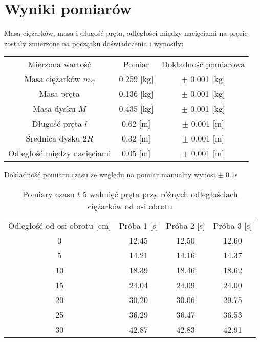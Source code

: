 \documentclass[10pt,a4paper]{article}
\newcommand{\forceindent}{\leavevmode{\parindent=3em\indent}}
\begin{document}
\section{Wyniki pomiarów}
\forceindent Masa ciężarków, masa i długość pręta, odległości między nacięciami na pręcie zostały zmierzone na początku doświadczenia i wynosiły:\\
\begin{center}
\begin{tabular}{|c|c|c|}
\hline
Mierzona wartość & Pomiar & Dokładność pomiarowa\\
\hhline{|=|=|=|}
Masa ciężarków $m_C$ & 0.259 [kg] & $\pm$ 0.001 [kg]\\
Masa pręta & 0.136 [kg] & $\pm$ 0.001 [kg]\\
Masa dysku $M$& 0.435 [kg] & $\pm$ 0.001 [kg]\\
\hline
Długość pręta $l$& 0.62 [m] & $\pm$ 0.001 [m]\\
Średnica dysku 2$R$ & 0.32 [m] & $\pm$ 0.001 [m]\\
\hline
Odległość między nacięciami & 0.05 [m] & $\pm$ 0.001 [m]\\
\hline

\end{tabular}
\end{center}
\vspace{10pt}

\forceindent Dokładność pomiaru czasu ze względu na pomiar manualny wynosi $\pm$ 0.1s
\vspace{10pt}
\begin{table}[!h]
\centering
\begin{tabular}{|c||c|c|c|}
\hline
Odległość od osi obrotu [cm]& Próba 1 [s] & Próba 2 [s] & Próba 3 [s] \\
\hhline{|=||=|=|=|}
0 & 12.45 & 12.50 & 12.60 \\ \hline
5 & 14.21 & 14.16 & 14.37 \\ 
10 & 18.39 & 18.46 & 18.62 \\
15 & 24.04 & 24.09 & 24.00 \\
20 & 30.20 & 30.06 & 29.75 \\
25 & 36.29 & 36.47 & 36.53 \\
30 & 42.87 & 42.83 & 42.91 \\
\hline

\end{tabular}
\caption{Pomiary czasu $t$ 5 wahnięć pręta przy różnych odległościach ciężarków od osi obrotu}
\end{table}
\vspace{10pt}
\end{document}
